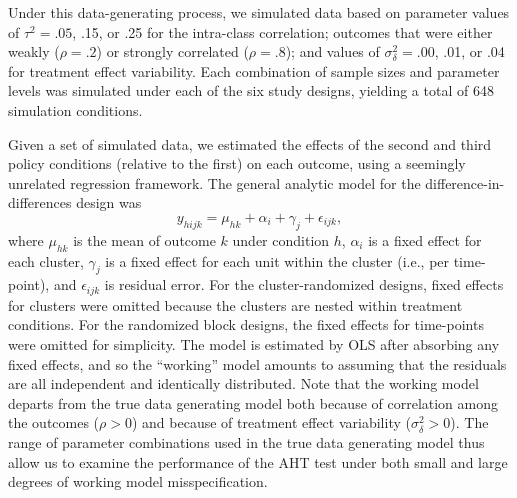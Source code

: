 \documentclass[draft]{ectaart}\usepackage[]{graphicx}\usepackage[]{color}
\begin{document}
Under this data-generating process, we simulated data based on parameter values of $\tau^2 = .05$, .15, or .25 for the intra-class correlation; outcomes that were either weakly ($\rho = .2$) or strongly correlated ($\rho = .8$); and values of $\sigma_\delta^2 = .00$, .01, or .04 for treatment effect variability.
Each combination of sample sizes and parameter levels was simulated under each of the six study designs, yielding a total of 648 simulation conditions.

Given a set of simulated data, we estimated the effects of the second and third policy conditions (relative to the first) on each outcome, using a seemingly unrelated regression framework. 
The general analytic model for the difference-in-differences design was
\begin{equation}
\label{eq:sim_analytic_model}
y_{hijk} = \mu_{hk} + \alpha_i + \gamma_j + \epsilon_{ijk},
\end{equation}
where $\mu_{hk}$ is the mean of outcome $k$ under condition $h$, $\alpha_i$ is a fixed effect for each cluster, $\gamma_j$ is a fixed effect for each unit within the cluster (i.e., per time-point), and $\epsilon_{ijk}$ is residual error. 
For the cluster-randomized designs, fixed effects for clusters were omitted because the clusters are nested within treatment conditions. For the randomized block designs, the fixed effects for time-points were omitted for simplicity.
The model is estimated by OLS after absorbing any fixed effects, and so the ``working'' model amounts to assuming that the residuals are all independent and identically distributed. Note that the working model departs from the true data generating model both because of correlation among the outcomes ($\rho > 0$) and because of treatment effect variability ($\sigma_\delta^2 > 0$). The range of parameter combinations used in the true data generating model thus allow us to examine the performance of the AHT test under both small and large degrees of working model misspecification. 
\end{document}
